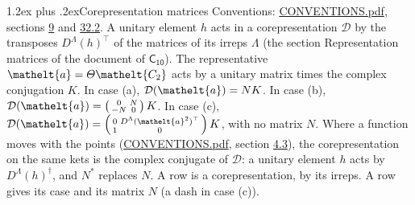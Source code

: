 \documentclass[10pt,a4paper]{article}
\makeatletter
\renewcommand\section{\@startsection{section}{1}{\z@}{-3ex plus -1ex minus -.2ex}%
  {1.2ex plus .2ex}{\normalfont\large\sffamily\bfseries\color{parttitle}}}
\numberwithin{equation}{section}
\newcommand{\eltfont}[1]{{\let\sigma\eltsigma\mathelt{#1}}}
\newcommand{\grp}[1]{\mathsf{#1}}
\newcommand{\elt}[1]{\eltfont{#1}}
\makeatother
\begin{document}
\section{Corepresentation matrices}\label{s:corep_matrices}
Conventions: \href{../../CONVENTIONS.pdf}{CONVENTIONS.pdf}, sections \href{../../../rotation/CONVENTIONS.pdf\#conv.9}{9} and \href{../../CONVENTIONS.pdf\#conv.32.2}{32.2}.
A unitary element $h$ acts in a corepresentation $\mathcal{D}$ by the transposes $D^{\Lambda}(h)^{\top}$ of the matrices of its irreps $\Lambda$ (the section Representation matrices of the document of \href{../../../rotation/data/pdf/C10.pdf}{$\grp{C_{10}}$}). The representative $\elt{a} = \varTheta\elt{C_{2}}$ acts by a unitary matrix times the complex conjugation $K$.
In case (a), $\mathcal{D}(\elt{a}) = NK$. In case (b), $\mathcal{D}(\elt{a}) = \left(\begin{smallmatrix} 0 & N \\ -N & 0 \end{smallmatrix}\right) K$. In case (c), $\mathcal{D}(\elt{a}) = \left(\begin{smallmatrix} 0 & D^{\Lambda}(\elt{a}^2)^{\top} \\ 1 & 0 \end{smallmatrix}\right) K$, with no matrix $N$.
Where a function moves with the points (\href{../../CONVENTIONS.pdf}{CONVENTIONS.pdf}, section \href{../../../rotation/CONVENTIONS.pdf\#conv.4.3}{4.3}), the corepresentation on the same kets is the complex conjugate of $\mathcal{D}$: a unitary element $h$ acts by $D^{\Lambda}(h)^{\dagger}$, and $N^{*}$ replaces $N$.
A row is a corepresentation, by its irreps. A row gives its case and its matrix $N$ (a dash in case (c)).
\end{document}
